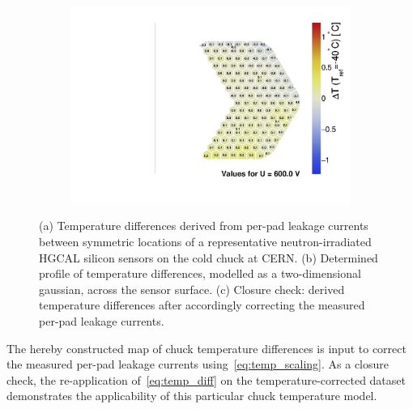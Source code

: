 \begin{figure}
\begin{subfigure}[b]{0.32\textwidth}
		\includegraphics[width=0.999\textwidth]{plots/chuck_temp_correction/Spring2021_ALPS_chucktempcorrected.pdf}
		\subcaption{
		}
		\label{plot:chucktemp_after}
	\end{subfigure}
	\caption{
		(a) Temperature differences derived from per-pad leakage currents between symmetric locations of a representative neutron-irradiated HGCAL silicon sensors on the cold chuck at CERN.
		(b) Determined profile of temperature differences, modelled as a two-dimensional gaussian, across the sensor surface.
		(c) Closure check: derived temperature differences after accordingly correcting the measured per-pad leakage currents.
	}
\end{figure}
The hereby constructed map of chuck temperature differences is input to correct the measured per-pad leakage currents using~\ref{eq:temp_scaling}.
As a closure check, the re-application of~\ref{eq:temp_diff} on the temperature-corrected dataset demonstrates the applicability of this particular chuck temperature model.
